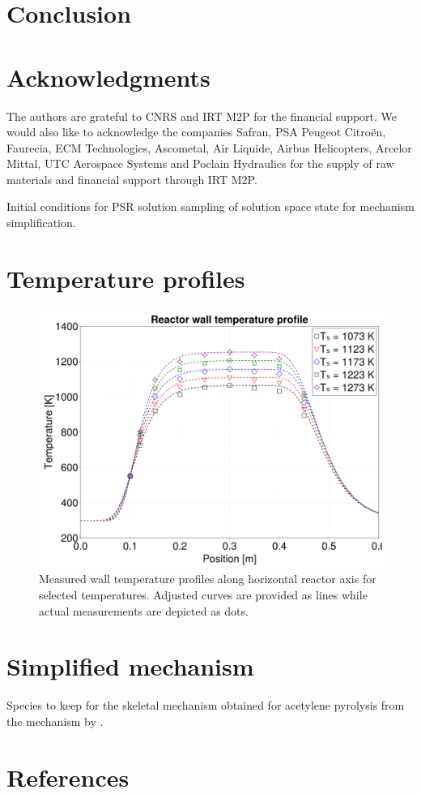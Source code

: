 \documentclass[final,3p,times,twocolumn,sort&compress]{elsarticle}
\begin{document}
\section{Conclusion}

\section*{Acknowledgments}

The authors are grateful to CNRS and IRT M2P for the financial support. We would also like to acknowledge the companies Safran, PSA Peugeot Citroën, Faurecia, ECM Technologies, Ascometal, Air Liquide, Airbus Helicopters, Arcelor Mittal, UTC Aerospace Systems and Poclain Hydraulics for the supply of raw materials and financial support through IRT M2P.

\begin{table}
	\caption{\label{tab-sampling-conditions}Initial conditions for PSR solution sampling of solution space state for mechanism simplification.}
\end{table}

\appendix
\section{Temperature profiles}
\begin{figure}
	\centering
	\includegraphics[width=\linewidth]{figures/wall-temperature}
	\caption{\label{fig:temperature-profile}Measured wall temperature profiles along horizontal reactor axis for selected temperatures. Adjusted curves are provided as lines while actual measurements are depicted as dots.}
\end{figure}

\section{Simplified mechanism}

\begin{table}
	\caption{\label{tab-species-to-kep}Species to keep for the skeletal mechanism obtained for acetylene pyrolysis from the mechanism by \citet{Norinaga2009}.}
\end{table}


\section*{References}

\end{document}
